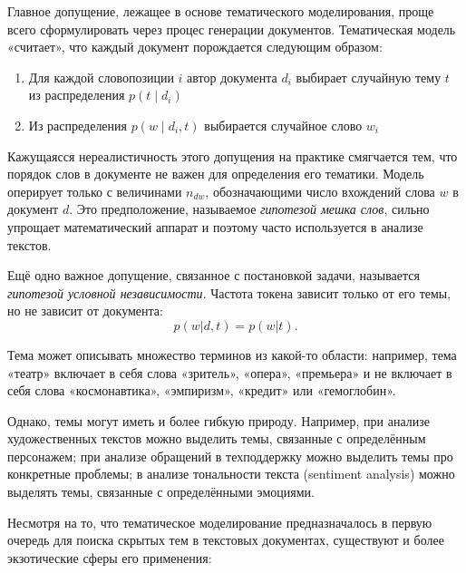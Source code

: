 Главное допущение, лежащее в основе тематического моделирования, проще всего сформулировать через процес генерации документов. Тематическая модель «считает», что каждый документ порождается следующим образом: 
\begin{enumerate}
    \item{Для каждой словопозиции $i$ автор документа $d_i$ выбирает случайную тему $t$ из распределения $p(t \mid d_i)$}
    \item{Из распределения $p(w \mid d_i,t)$ выбирается случайное слово $w_i$}
\end{enumerate}

Кажущаясся нереалистичность этого допущения на практике смягчается тем, что порядок слов в документе не важен для определения его тематики. Модель оперирует только с величинами $n_{dw}$, обозначающими число вхождений слова $w$ в документ $d$. Это предположение, называемое  \textit{гипотезой мешка слов}, сильно упрощает математический аппарат и поэтому часто используется в анализе текстов.

Ещё одно важное допущение, связанное с постановкой задачи, называется \textit{гипотезой условной независимости}. Частота токена зависит только от его темы, но не зависит от документа:
\begin{equation}
    p(w| d,t) = p(w| t).
\end{equation}

Тема может описывать множество терминов из какой-то области: например, тема «театр» включает в себя слова «зритель», «опера», «премьера» и не включает в себя слова «космонавтика», «эмпиризм», «кредит» или «гемоглобин». 

Однако, темы могут иметь и более гибкую природу. Например, при анализе художественных текстов можно выделить темы, связанные с определённым персонажем; при анализе обращений в техподдержку можно выделить темы про конкретные проблемы; в анализе тональности текста (sentiment analysis) можно выделять темы, связанные с определёнными эмоциями.

Несмотря на то, что тематическое моделирование предназначалось в первую очередь для поиска скрытых тем в текстовых документах, существуют и более экзотические сферы его применения:

